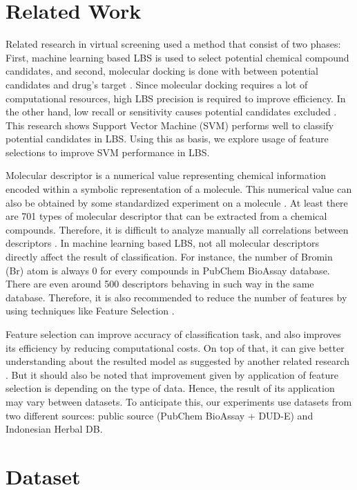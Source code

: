 \documentclass[conference,compsoc,12pt]{IEEEtran}
\begin{document}
\section{Related Work}

Related research in virtual screening used a method that consist of two phases: First, machine learning based LBS is used to select potential chemical compound candidates, and second, molecular docking is done with between potential candidates and drug's target \cite{hilman2012analisis}. Since molecular docking requires a lot of computational resources, high LBS precision is required to improve efficiency. In the other hand, low recall or sensitivity causes potential candidates excluded \cite{korkmaz2014drug}. This research shows Support Vector Machine (SVM) performs well to classify potential candidates in LBS. Using this as basis, we explore usage of feature selections to improve SVM performance in LBS.

Molecular descriptor is a numerical value representing chemical information encoded within a symbolic representation of a molecule. This numerical value can also be obtained by some standardized experiment on a molecule \cite{yap2011padel}. At least there are 701 types of molecular descriptor that can be extracted from a chemical compounds. Therefore, it is difficult to analyze manually all correlations between descriptors \cite{korkmaz2014drug}. In machine learning based LBS, not all molecular descriptors directly affect the result of classification. For instance, the number of Bromin (Br) atom is always 0 for every compounds in PubChem BioAssay database. There are even around 500 descriptors behaving in such way in the same database. Therefore, it is also recommended to reduce the number of features by using techniques like Feature Selection \cite{korkmaz2014drug}.

Feature selection can improve accuracy of classification task, and also improves its efficiency by reducing computational costs. On top of that, it can give better understanding about the resulted model as suggested by another related research \cite{janecek2008relationship}. But it should also be noted that improvement given by application of feature selection is depending on the type of data. Hence, the result of its application may vary between datasets\cite{janecek2008relationship}. To anticipate this, our experiments use datasets from two different sources: public source (PubChem BioAssay + DUD-E) and Indonesian Herbal DB.

\section{Dataset} \label{Dataset}
\end{document}
